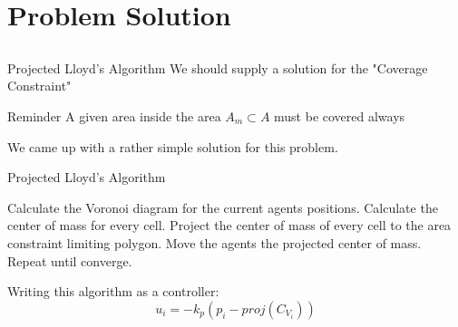 \documentclass[t]{beamer}
\begin{document}

\section[Problem Solution]{Problem Solution}

\subsection[Projected Lloyd's Algorithm]{}
\begin{frame}[label=projlloydsalgo1]{Projected Lloyd's Algorithm}
We should supply a solution for the "Coverage Constraint" \pause
\begin{block}{Reminder}
A given area inside the area $A_{m} \subset A$ must be covered always
\end{block}\pause
We came up with a rather simple solution for this problem.
\end{frame}

\begin{frame}[label=projlloydsalgo2]{Projected Lloyd's Algorithm}
\begin{algorithm}[H]
\caption{Projected Lloyd's Algorithm (PLA)}\label{ProjLloydsAlgorithm}
\begin{algorithmic}[1]
\State Calculate the Voronoi diagram for the current agents positions.
\State Calculate the center of mass for every cell.
\State Project the center of mass of every cell to the area constraint limiting polygon.
\State Move the agents the projected center of mass.
\State Repeat until converge.
\end{algorithmic}
\end{algorithm}

Writing this algorithm as a controller:
\begin{equation} \label{ProjectedLloydsContol}
u_{i} = -k_{p}\left( p_i - \textit{proj}\left( C_{V_{i}} \right) \right)
\end{equation} 
\end{frame}
\end{document}
